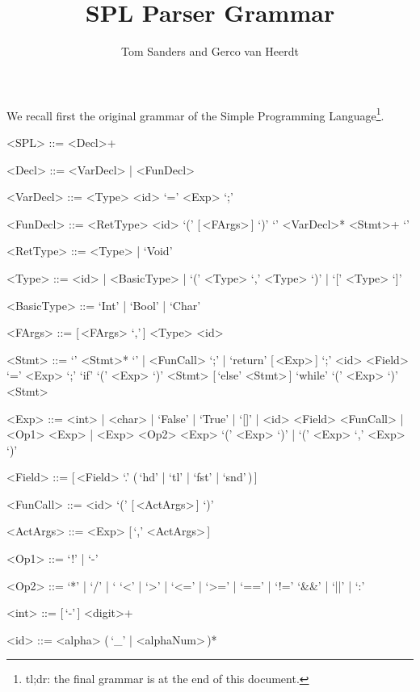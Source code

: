 \documentclass{article}
\title{SPL Parser Grammar}
\author{Tom Sanders and Gerco van Heerdt}
\begin{document}
\maketitle

We recall first the original grammar of the Simple Programming Language\footnote{%
    tl;dr: the final grammar is at the end of this document.
}.
\setlength{\grammarindent}{6.8em}
\begin{grammar}
    <SPL> ::= <Decl>+

    <Decl> ::= <VarDecl> | <FunDecl>

    <VarDecl> ::= <Type> <id> `=' <Exp> `;'

    <FunDecl> ::= <RetType> <id> `(' [\,<FArgs>\,] `)' `{' <VarDecl>* <Stmt>+ `}'

    <RetType> ::= <Type> | `Void'

    <Type> ::= <id> | <BasicType> | `(' <Type> `,' <Type> `)' | `[' <Type> `]'

    <BasicType> ::= `Int' | `Bool' | `Char'

    <FArgs> ::= [\,<FArgs> `,'\,] <Type> <id>

    <Stmt> ::= `{' <Stmt>* `}' | <FunCall> `;' | `return' [\,<Exp>\,] `;'
    \alt <id> <Field> `=' <Exp> `;'
    \alt `if' `(' <Exp> `)' <Stmt> [\,`else' <Stmt>\,]
    \alt `while' `(' <Exp> `)' <Stmt>

    <Exp> ::= <int> | <char> | `False' | `True' | `[]' | <id> <Field>
    \alt <FunCall> | <Op1> <Exp> | <Exp> <Op2> <Exp>
    \alt `(' <Exp> `)' | `(' <Exp> `,' <Exp> `)'

    <Field> ::= [\,<Field> `.' (\,`hd' | `tl' | `fst' | `snd'\,)\,]

    <FunCall> ::= <id> `(' [\,<ActArgs>\,] `)'

    <ActArgs> ::= <Exp> [\,`,' <ActArgs>\,]

    <Op1> ::= `!' | `-'

    <Op2> ::=  `*' | `/' | `%
    \alt `<' | `>' | `<=' | `>=' | `==' | `!='
    \alt `&&' | `||' | `:'

    <int> ::= [\,`-'\,] <digit>+

    <id> ::= <alpha> (\,`_' | <alphaNum>\,)*
\end{grammar}
\end{document}
